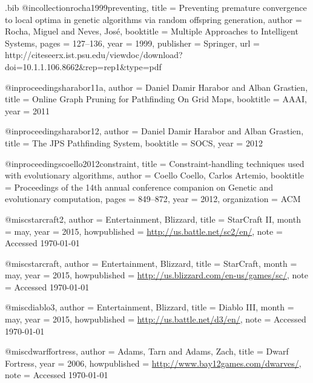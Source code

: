 \begin{filecontents*}{\jobname.bib}
@incollection{rocha1999preventing,
	title		= {{P}reventing {p}remature {c}onvergence to {l}ocal {o}ptima in {g}enetic {a}lgorithms via {r}andom {o}ffspring {g}eneration},
	author	= {Rocha, Miguel and Neves, Jos{\'e}},
	booktitle	= {Multiple Approaches to Intelligent Systems},
	pages		= {127--136},
	year		= {1999},
	publisher	= {Springer},
	url 		= {http://citeseerx.ist.psu.edu/viewdoc/download?doi=10.1.1.106.8662&rep=rep1&type=pdf}
}

@inproceedings{harabor11a,
	author	= {Daniel Damir Harabor and Alban Grastien},
	title     	= {{O}nline {G}raph {P}runing for {P}athfinding {O}n {G}rid {M}aps},
	booktitle 	= {AAAI},
	year      	= {2011}
}

@inproceedings{harabor12,
	author    	= {Daniel Damir Harabor and Alban Grastien},
	title     	= {{T}he {J}{P}{S} {P}athfinding {S}ystem},
	booktitle 	= {SOCS},
	year      	= {2012}
}

@inproceedings{coello2012constraint,
	title		= {{C}onstraint-{h}andling {t}echniques used with {e}volutionary {a}lgorithms},
	author	= {Coello Coello, Carlos Artemio},
	booktitle	= {Proceedings of the 14th annual conference companion on Genetic and evolutionary computation},
	pages		= {849--872},
	year		= {2012},
	organization	= {ACM}
}

@misc{starcraft2,
	author 	= {Entertainment, Blizzard},
	title 		= {StarCraft II},
	month 	= may,
	year 		= {2015},
	howpublished = {\url{http://us.battle.net/sc2/en/}},
	note  		= {Accessed \today}
}

@misc{starcraft,
	author 	= {Entertainment, Blizzard},
	title 		= {StarCraft},
	month 	= may,
	year 		= {2015},
	howpublished = {\url{http://us.blizzard.com/en-us/games/sc/}},
	note  		= {Accessed \today}
}

@misc{diablo3,
	author 	= {Entertainment, Blizzard},
	title 		= {Diablo III},
	month 	= may,
	year 		= {2015},
	howpublished = {\url{http://us.battle.net/d3/en/}},
	note  		= {Accessed \today}
}

@misc{dwarffortress,
	author 	= {Adams, Tarn and Adams, Zach},
	title 		= {{D}warf {F}ortress},
	year 		= {2006}, 
	howpublished = {\url{http://www.bay12games.com/dwarves/}},
	note		= {Accessed \today}
}

\end{filecontents*}


